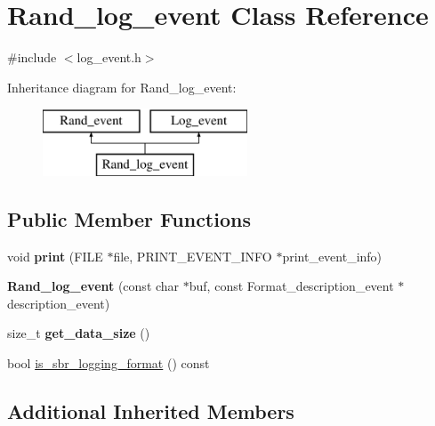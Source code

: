 \hypertarget{classRand__log__event}{}\section{Rand\+\_\+log\+\_\+event Class Reference}
\label{classRand__log__event}


{\ttfamily \#include $<$log\+\_\+event.\+h$>$}

Inheritance diagram for Rand\+\_\+log\+\_\+event\+:\begin{figure}[H]
\begin{center}
\leavevmode
\includegraphics[height=2.000000cm]{classRand__log__event}
\end{center}
\end{figure}
\subsection*{Public Member Functions}
\begin{DoxyCompactItemize}
\item 
\mbox{\label{classRand__log__event_a931ddc464998a860f57fd56521e04c36}} 
void {\bfseries print} (F\+I\+LE $\ast$file, P\+R\+I\+N\+T\+\_\+\+E\+V\+E\+N\+T\+\_\+\+I\+N\+FO $\ast$print\+\_\+event\+\_\+info)
\item 
\mbox{\label{classRand__log__event_a6508e0206a97300fe3edce1e3b690603}} 
{\bfseries Rand\+\_\+log\+\_\+event} (const char $\ast$buf, const Format\+\_\+description\+\_\+event $\ast$description\+\_\+event)
\item 
\mbox{\label{classRand__log__event_a57f372903697b28c1519887c9e25ac8c}} 
size\+\_\+t {\bfseries get\+\_\+data\+\_\+size} ()
\item 
bool \mbox{\hyperlink{classRand__log__event_a3b5f698453eb2deee160e5ab771e94b2}{is\+\_\+sbr\+\_\+logging\+\_\+format}} () const
\end{DoxyCompactItemize}
\subsection*{Additional Inherited Members}



